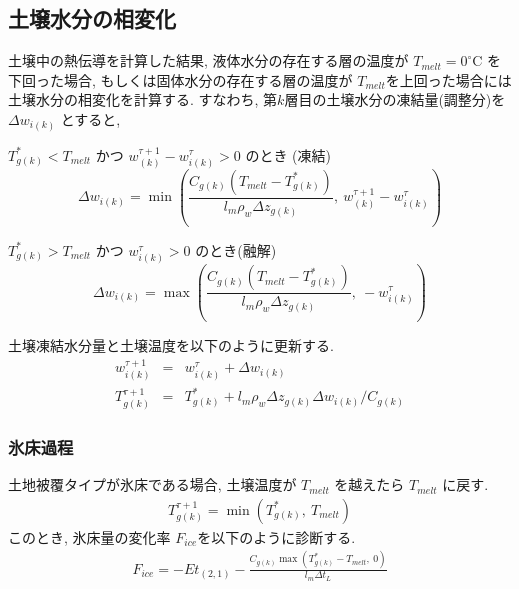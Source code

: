 \subsection{土壌水分の相変化}

土壌中の熱伝導を計算した結果, 液体水分の存在する層の温度が $T_{melt} =
0^{\circ}$C を下回った場合, もしくは固体水分の存在する層の温度が
$T_{melt}$を上回った場合には土壌水分の相変化を計算する.
すなわち, 第$k$層目の土壌水分の凍結量(調整分)を $\Delta w_{i(k)}$ とすると,

$T_{g(k)}^*<T_{melt}$ かつ $w_{(k)}^{\tau+1}-w_{i(k)}^{\tau}>0$ のとき
(凍結)
\begin{equation}
\Delta w_{i(k)} = \min\left(
\frac{C_{g(k)}(T_{melt}-T_{g(k)}^*)}{l_m \rho_w \Delta z_{g(k)}}, \
w_{(k)}^{\tau+1}-w_{i(k)}^{\tau}
\right)
\end{equation}

$T_{g(k)}^*>T_{melt}$ かつ $w_{i(k)}^{\tau}>0$ のとき(融解)
\begin{equation}
\Delta w_{i(k)} = \max\left(
\frac{C_{g(k)}(T_{melt}-T_{g(k)}^*)}{l_m \rho_w \Delta z_{g(k)}}, \
-w_{i(k)}^{\tau}
\right)
\end{equation}

土壌凍結水分量と土壌温度を以下のように更新する.
\begin{eqnarray}
w_{i(k)}^{\tau+1} &=& w_{i(k)}^{\tau} + \Delta w_{i(k)} \\
T_{g(k)}^{\tau+1} &=& T_{g(k)}^* + l_m \rho_w \Delta z_{g(k)} \Delta w_{i(k)} / C_{g(k)}
\end{eqnarray}

\subsubsection{氷床過程}

土地被覆タイプが氷床である場合, 土壌温度が $T_{melt}$ を越えたら
$T_{melt}$ に戻す.
\begin{eqnarray}
 T_{g(k)}^{\tau+1} = \min( T_{g(k)}^*, \ T_{melt} )
\end{eqnarray}
このとき, 氷床量の変化率 $F_{ice}$を以下のように診断する.
\begin{eqnarray}
 F_{ice} = - Et_{(2,1)} - \frac{C_{g(k)}\max(T_{g(k)}^* - T_{melt},\ 0)}{l_m \Delta t_L}
\end{eqnarray}
